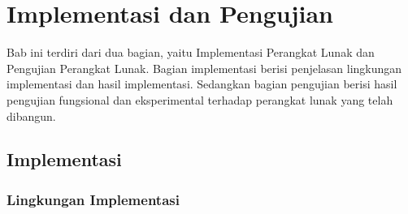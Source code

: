 \chapter{Implementasi dan Pengujian}
\label{chap:implementasi}

Bab ini terdiri dari dua bagian, yaitu Implementasi Perangkat Lunak dan Pengujian Perangkat Lunak. Bagian implementasi berisi penjelasan lingkungan implementasi dan hasil implementasi. Sedangkan bagian pengujian berisi hasil pengujian fungsional dan eksperimental terhadap perangkat lunak yang telah dibangun.

\section{Implementasi}

\subsection{Lingkungan Implementasi}

